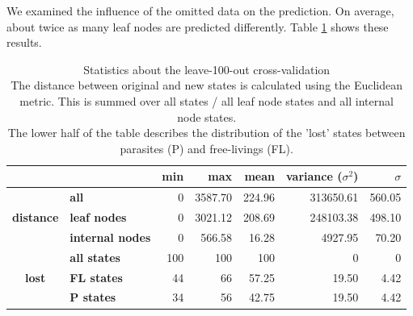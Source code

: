       We examined the influence of the omitted data on the prediction. On average, about twice as many 
        leaf nodes are predicted differently. %
        Table \ref{table:statistics cross-validation} shows these results. \\
      \begin{table}[h!]
        \begin{center}
          \begin{tabular}{ |cl||r|r|r|r|r| }
            \hline
            & & \bfseries min & \bfseries max & \bfseries mean & \bfseries variance ($\sigma^2$) & $\sigma$ \\
            \hline \hline
            \multirow{3}{*}{\bfseries distance} & \bfseries all     & 0 & 3587.70 & 224.96 & 313650.61 & 560.05 \\
            & \bfseries leaf nodes                                  & 0 & 3021.12 & 208.69 & 248103.38 & 498.10 \\
            & \bfseries internal nodes                              & 0 & 566.58 & 16.28 & 4927.95 & 70.20 \\ \hline
            \multirow{3}{*}{\bfseries lost} & \bfseries all states  & 100 & 100 & 100 & 0 & 0 \\
            & \bfseries FL states                                   & 44 & 66 & 57.25 & 19.50 & 4.42 \\
            & \bfseries P states                                    & 34 & 56 & 42.75 & 19.50 & 4.42 \\
            \hline
          \end{tabular}
        \end{center}
        \caption{Statistics about the leave-100-out cross-validation \\
          The distance between original and new states is calculated using the Euclidean metric. This 
            is summed over all states / all leaf node states and all internal node states. \\
          The lower half of the table describes the distribution of the 'lost' states between parasites 
            (P) and free-livings (FL).}
        \label{table:statistics cross-validation}
      \end{table}


